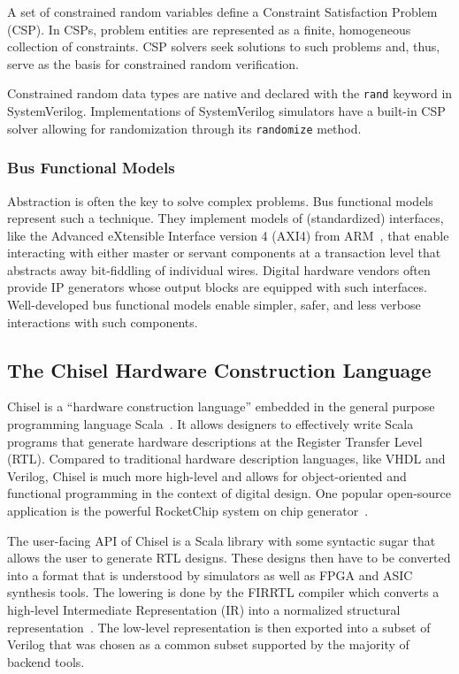\documentclass[conference]{IEEEtran}
\begin{document}
A set of constrained random variables define a Constraint Satisfaction Problem (CSP). In CSPs, 
problem entities are represented as a finite, homogeneous collection of constraints. CSP solvers 
seek solutions to such problems and, thus, serve as the basis for constrained random verification.

Constrained random data types are native and declared with the \texttt{rand} keyword in SystemVerilog. 
Implementations of SystemVerilog simulators have a built-in CSP solver allowing for randomization through its \texttt{randomize} method.

\subsubsection{Bus Functional Models}
Abstraction is often the key to solve complex problems. Bus functional models represent such 
a technique. They implement models of (standardized) interfaces, like the Advanced eXtensible Interface version 4 (AXI4) from ARM~\cite{axi4standard}, that enable 
interacting with either master or servant components at a transaction level that abstracts away 
bit-fiddling of individual wires. Digital hardware vendors often provide IP generators whose output 
blocks are equipped with such interfaces. Well-developed bus functional models enable simpler, safer, and less 
verbose interactions with such components.

\subsection{The Chisel Hardware Construction Language}\label{subsec:chisel}

Chisel is a ``hardware construction language'' embedded in the general purpose programming language Scala~\cite{bachrach2012chisel, chisel:book}.
It allows designers to effectively write Scala programs that generate hardware descriptions at the Register Transfer Level (RTL).
Compared to traditional hardware description languages, like 
VHDL and Verilog, Chisel is much more high-level and allows for object-oriented and functional 
programming in the context of digital design.
One popular open-source application is the powerful RocketChip system on chip generator~\cite{rocketchip}.

The user-facing API of Chisel is a Scala library with some syntactic sugar that allows the user to generate RTL designs.
These designs then have to be converted into a format that is understood by simulators as well as FPGA and ASIC synthesis tools.
The lowering is done by the FIRRTL compiler which converts a high-level Intermediate Representation (IR) into a normalized structural representation~\cite{firrtl}.
The low-level representation is then exported into a subset of Verilog that was chosen as a common subset supported by the majority of backend tools.
\end{document}
